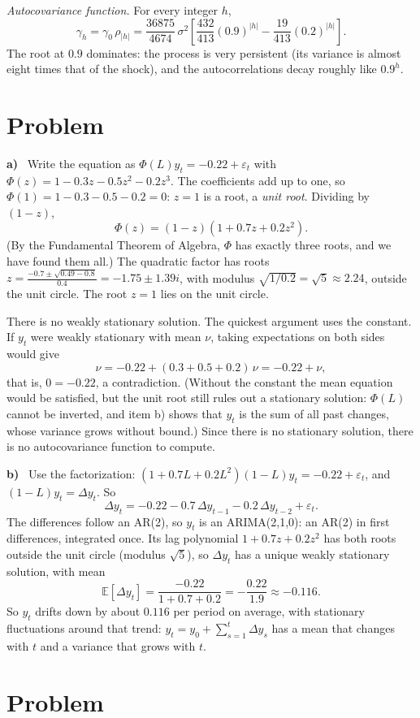 \documentclass[11pt]{article}
\newcommand{\E}{\mathbb{E}}
\newcounter{problem}
\renewcommand{\theproblem}{\arabic{problem}}
\newcommand{\problem}{
	\stepcounter{problem}
	\section*{Problem \theproblem}
}
\newcommand{\itm}[1]{\par\textbf{#1)}\ }
\begin{document}
\emph{Autocovariance function.} For every integer $h$,
\[
\gamma_h = \gamma_0\,\rho_{|h|} = \frac{36875}{4674}\,\sigma^2\left[\frac{432}{413}(0.9)^{|h|} - \frac{19}{413}(0.2)^{|h|}\right].
\]
The root at $0.9$ dominates: the process is very persistent (its variance is almost eight times that of the shock), and the autocorrelations decay roughly like $0.9^h$.

\problem

\itm{a}
Write the equation as $\Phi(L)y_t = -0.22+\varepsilon_t$ with $\Phi(z) = 1-0.3z-0.5z^2-0.2z^3$. The coefficients add up to one, so $\Phi(1) = 1-0.3-0.5-0.2 = 0$: $z=1$ is a root, a \emph{unit root}. Dividing by $(1-z)$,
\[
\Phi(z) = (1-z)(1+0.7z+0.2z^2).
\]
(By the Fundamental Theorem of Algebra, $\Phi$ has exactly three roots, and we have found them all.) The quadratic factor has roots $z = \frac{-0.7\pm\sqrt{0.49-0.8}}{0.4} = -1.75\pm1.39i$, with modulus $\sqrt{1/0.2} = \sqrt5\approx2.24$, outside the unit circle. The root $z=1$ lies on the unit circle.

There is no weakly stationary solution. The quickest argument uses the constant. If $y_t$ were weakly stationary with mean $\nu$, taking expectations on both sides would give
\[
\nu = -0.22 + (0.3+0.5+0.2)\,\nu = -0.22+\nu,
\]
that is, $0=-0.22$, a contradiction. (Without the constant the mean equation would be satisfied, but the unit root still rules out a stationary solution: $\Phi(L)$ cannot be inverted, and item b) shows that $y_t$ is the sum of all past changes, whose variance grows without bound.) Since there is no stationary solution, there is no autocovariance function to compute.

\itm{b}
Use the factorization: $(1+0.7L+0.2L^2)(1-L)y_t = -0.22+\varepsilon_t$, and $(1-L)y_t=\Delta y_t$. So
\[
\Delta y_t = -0.22 - 0.7\,\Delta y_{t-1} - 0.2\,\Delta y_{t-2} + \varepsilon_t .
\]
The differences follow an AR(2), so $y_t$ is an ARIMA(2,1,0): an AR(2) in first differences, integrated once. Its lag polynomial $1+0.7z+0.2z^2$ has both roots outside the unit circle (modulus $\sqrt5$), so $\Delta y_t$ has a unique weakly stationary solution, with mean
\[
\E[\Delta y_t] = \frac{-0.22}{1+0.7+0.2} = -\frac{0.22}{1.9}\approx-0.116 .
\]
So $y_t$ drifts down by about $0.116$ per period on average, with stationary fluctuations around that trend: $y_t = y_0 + \sum_{s=1}^t\Delta y_s$ has a mean that changes with $t$ and a variance that grows with $t$.

\problem
\end{document}
